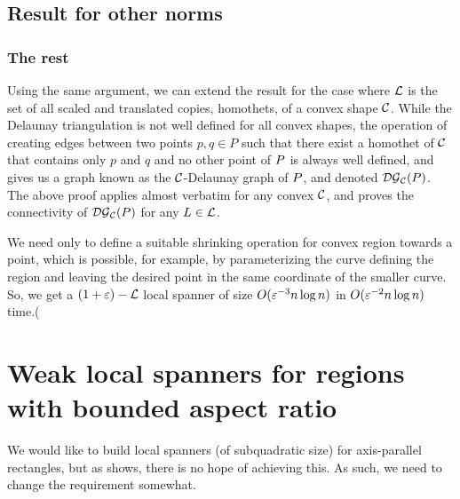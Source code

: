 \documentclass[12pt]{article}%
\begin{document}
\subsection{Result for other norms}

\subsubsection{The rest}


Using the same argument, we can extend the result for the case where
$\mathcal{L}$ is the set of all scaled and translated copies, homothets, of a
convex shape $\mathcal{C}$. While the Delaunay triangulation is not well
defined for all convex shapes, the operation of creating edges between
two points $p,q\in P$ such that there exist a homothet of $\mathcal{C}$ that
contains only $p$ and $q$ and no other point of $P$ is always well
defined, and gives us a graph known as the $\mathcal{C}$-Delaunay graph of
$P$, and denoted $\mathcal{DG}_{\mathcal{C}}(P)$. The above proof applies almost
verbatim for any convex $\mathcal{C}$, and proves the connectivity of
$\mathcal{DG}_{\mathcal{C}}(P)$ for any $L\in \mathcal{L}$.

We need only to define a suitable shrinking operation for convex
region towards a point, which is possible, for example, by
parameterizing the curve defining the region and leaving the desired
point in the same coordinate of the smaller curve. So, we get a
$(1+\varepsilon)-\mathcal{L}$ local spanner of size $O(\varepsilon^{-3}n\log n)$ in
$O(\varepsilon^{-2}n\log n)$ time.(



\section{Weak local spanners for regions %
   with bounded aspect ratio}

We would like to build local spanners (of subquadratic size) for
axis-parallel rectangles, but as  shows, there
is no hope of achieving this. As such, we need to change the
requirement somewhat.
\end{document}
